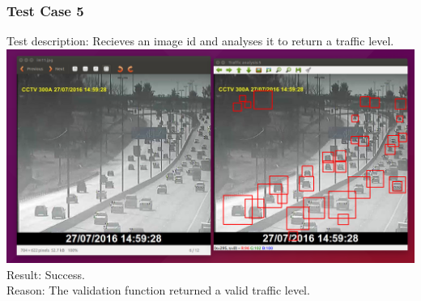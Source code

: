 \documentclass[a4paper,12pt]{article}
\begin{document}
\subsubsection{Test Case 5}
Test description: Recieves an image id and analyses it to return a traffic level.
\includegraphics[scale=0.3]{images/image_analysis.png}\\
Result: Success.\\
Reason: The validation function returned a valid traffic level.
\end{document}
